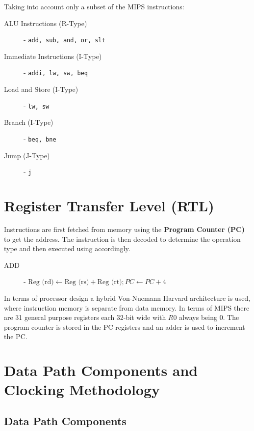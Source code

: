 \documentclass[12pt letter]{report}
\begin{document}
Taking into account only a subset of the MIPS instructions:
\begin{description}
  \item[ALU Instructions (R-Type)] - \texttt{add, sub, and, or, slt}
  \item[Immediate Instructions (I-Type)] - \texttt{addi, lw, sw, beq}
  \item[Load and Store (I-Type)] - \texttt{lw, sw}
  \item[Branch (I-Type)] - \texttt{beq, bne}
  \item[Jump (J-Type)] - \texttt{j}
\end{description}

\section{Register Transfer Level (RTL)}


Instructions are first fetched from memory using the \textbf{Program Counter (PC)} to get the address. The instruction is then decoded to determine the operation type and then executed using accordingly.
\begin{description}
  \item[ADD]  - $\text{Reg (rd)} \gets \text{Reg (rs)} + \text{Reg (rt)}; PC \gets PC + 4$
\end{description}

In terms of processor design a hybrid Von-Nuemann Harvard architecture is used, where instruction memory is separate from data memory. In terms of MIPS there are
31 general purpose registers each 32-bit wide with $R0$ always being 0. The program counter is stored in the PC registers and an adder is used to increment the PC.

\section{Data Path Components and Clocking Methodology}

\subsection{Data Path Components}

\end{document}

